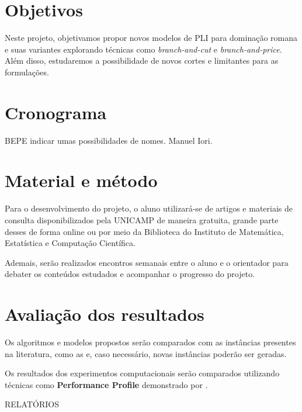 \documentclass[11pt]{article}
\begin{document}
\section{Objetivos}
\label{sec:org8120bf4}
Neste projeto, objetivamos propor novos modelos de PLI para dominação romana e suas variantes explorando técnicas como \emph{branch-and-cut} e \emph{branch-and-price}.
Além disso, estudaremos a possibilidade de novos cortes e limitantes para as formulações.

\textcite{Lima2022Exactsolutionnetwork}
\textcite{Pessoa2021SolvingBinPacking}
\section{Cronograma}
\label{sec:org6b6bbbf}
BEPE indicar umas possibilidades de nomes. Manuel Iori.

\section{Material e método}
\label{sec:org1a7079f}
Para o desenvolvimento do projeto, o aluno utilizará-se de artigos e materiais de consulta disponibilizados pela UNICAMP de maneira gratuita, grande parte desses de forma online ou por meio da Biblioteca do Instituto de Matemática, Estatística e Computação Científica.

Ademais, serão realizados encontros semanais entre o aluno e o orientador para debater os conteúdos estudados e acompanhar o progresso do projeto.

\section{Avaliação dos resultados}
\label{sec:org84800e3}
Os algoritmos e modelos propostos serão comparados com as instâncias presentes na literatura, como as \textcite{GraphColoringInstances} e, caso necessário, novas instâncias poderão ser geradas.

Os resultados dos experimentos computacionais serão comparados utilizando técnicas como \textbf{Performance Profile} demonstrado por \textcite{Dolan2002Benchmarkingoptimizationsoftware}.

RELATÓRIOS

\printbibliography
\end{document}

